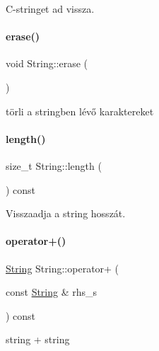 C-\/stringet ad vissza. 

\mbox{\label{class_string_a3ce2ea55be9ec912bb2dbc88d461b479}} 
\paragraph{\texorpdfstring{erase()}{erase()}}
{\footnotesize\ttfamily void String\+::erase (\begin{DoxyParamCaption}{ }\end{DoxyParamCaption})\hspace{0.3cm}{\ttfamily [inline]}}



törli a stringben lévő karaktereket 

\mbox{\label{class_string_ad3b888edbfb3bab21d4bae4663d2211a}} 
\paragraph{\texorpdfstring{length()}{length()}}
{\footnotesize\ttfamily size\+\_\+t String\+::length (\begin{DoxyParamCaption}{ }\end{DoxyParamCaption}) const\hspace{0.3cm}{\ttfamily [inline]}}



Visszaadja a string hosszát. 

\mbox{\label{class_string_a28a020f061e5f25317af47488bfb7de8}} 
\paragraph{\texorpdfstring{operator+()}{operator+()}\hspace{0.1cm}{\footnotesize\ttfamily [1/2]}}
{\footnotesize\ttfamily \mbox{\hyperlink{class_string}{String}} String\+::operator+ (\begin{DoxyParamCaption}\item[{const \mbox{\hyperlink{class_string}{String}} \&}]{rhs\+\_\+s }\end{DoxyParamCaption}) const}



string + string 

\mbox{\label{class_string_afa169686af6b513e1f059cf2bf39695f}} 
